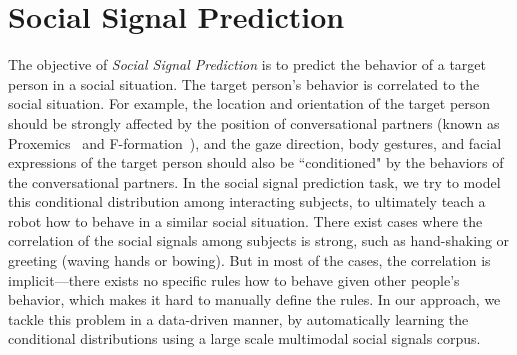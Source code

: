 

\section{Social Signal Prediction}
The objective of \emph{Social Signal Prediction} is to predict the behavior of a target person in a social situation. The target person's behavior is correlated to the social situation. For example, the location and orientation of the target person should be strongly affected by the position of conversational partners (known as Proxemics~\cite{Hall66} and F-formation~\cite{kendon90}), and the gaze direction, body gestures, and facial expressions of the target person should also be ``conditioned" by the behaviors of the conversational partners. In the social signal prediction task, we try to model this conditional distribution among interacting subjects, to ultimately teach a robot how to behave in a similar social situation. There exist cases where the correlation of the social signals among subjects is strong, such as hand-shaking or greeting (waving hands or bowing). But in most of the cases, the correlation is implicit---there exists no specific rules how to behave given other people's behavior, which makes it hard to manually define the rules. In our approach, we tackle this problem in a data-driven manner, by automatically learning the conditional distributions using a large scale multimodal social signals corpus.  

